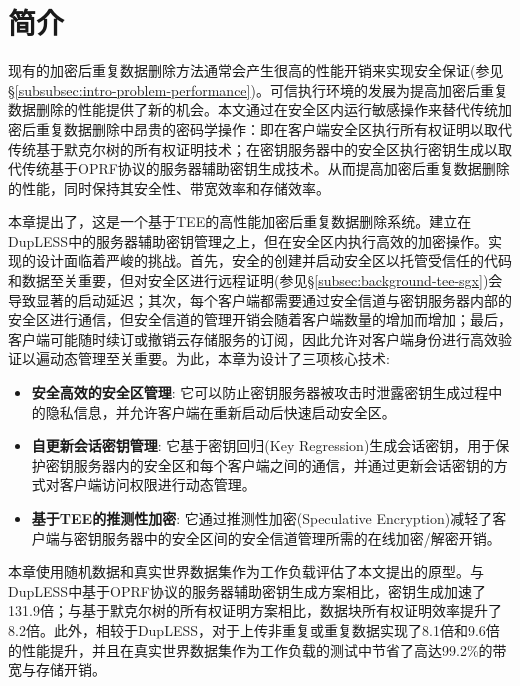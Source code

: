 \section{简介}
\label{sec:sgxdedup-introduction}

现有的加密后重复数据删除方法通常会产生很高的性能开销来实现安全保证(参见\S\ref{subsubsec:intro-problem-performance})。可信执行环境\cite{trustzone,sgx,MK-TME,AMDSEV}的发展为提高加密后重复数据删除的性能提供了新的机会。本文通过在安全区内运行敏感操作来替代传统加密后重复数据删除中昂贵的密码学操作：即在客户端安全区执行所有权证明以取代传统基于默克尔树的所有权证明技术；在密钥服务器中的安全区执行密钥生成以取代传统基于OPRF协议的服务器辅助密钥生成技术。从而提高加密后重复数据删除的性能，同时保持其安全性、带宽效率和存储效率。

本章提出了\sysnameS，这是一个基于TEE的高性能加密后重复数据删除系统。\sysnameS 建立在DupLESS\cite{bellare2013DupLESS}中的服务器辅助密钥管理之上，但在安全区内执行高效的加密操作。实现\sysnameS 的设计面临着严峻的挑战。首先，安全的创建并启动安全区以托管受信任的代码和数据至关重要，但对安全区进行远程证明(参见\S\ref{subsec:background-tee-sgx})会导致显著的启动延迟；其次，每个客户端都需要通过安全信道与密钥服务器内部的安全区进行通信，但安全信道的管理开销会随着客户端数量的增加而增加；最后，客户端可能随时续订或撤销云存储服务的订阅，因此允许对客户端身份进行高效验证以遍动态管理至关重要。为此，本章为\sysnameS 设计了三项核心技术:

\begin{itemize}[leftmargin=*]
    \item \textbf{安全高效的安全区管理}:
          它可以防止密钥服务器被攻击时泄露密钥生成过程中的隐私信息，并允许客户端在重新启动后快速启动安全区。
    \item \textbf{自更新会话密钥管理}:
          它基于密钥回归(Key Regression)\cite{fu06}生成会话密钥，用于保护密钥服务器内的安全区和每个客户端之间的通信，并通过更新会话密钥的方式对客户端访问权限进行动态管理。
    \item \textbf{基于TEE的推测性加密}:
          它通过推测性加密(Speculative Encryption)\cite{eduardo2019Speculative}减轻了客户端与密钥服务器中的安全区间的安全信道管理所需的在线加密/解密开销。
\end{itemize}

本章使用随机数据和真实世界数据集\cite{fsl,meyer2011deduplication}作为工作负载评估了本文提出的\sysnameS 原型。与DupLESS\cite{bellare2013DupLESS}中基于OPRF协议的服务器辅助密钥生成方案相比，密钥生成加速了131.9倍；与基于默克尔树的所有权证明方案\cite{halevi11}相比，数据块所有权证明效率提升了8.2倍。此外，相较于DupLESS\cite{bellare2013DupLESS}，\sysnameS 对于上传非重复或重复数据实现了8.1倍和9.6倍的性能提升，并且在真实世界数据集作为工作负载的测试中节省了高达99.2\%的带宽与存储开销。

